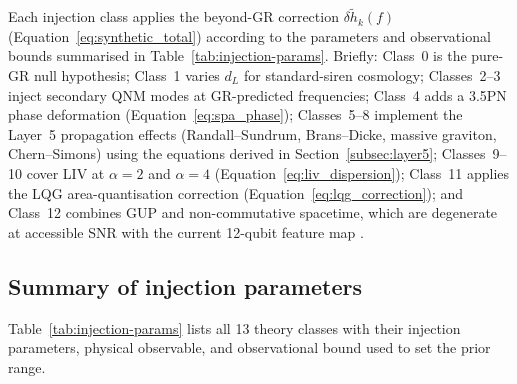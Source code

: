 \documentclass[11pt,a4paper, english]{book}
\theoremstyle{plain}
\theoremstyle{definition}
\numberwithin{equation}{chapter}
\numberwithin{figure}{chapter}
\numberwithin{table}{chapter}
\begin{document}
Each injection class applies the beyond-GR correction
$\delta\tilde{h}_k(f)$ (Equation~\ref{eq:synthetic_total})
according to the parameters and observational bounds
summarised in Table~\ref{tab:injection-params}. Briefly:
Class~0 is the pure-GR null hypothesis; Class~1 varies
$d_L$ for standard-siren cosmology; Classes~2--3 inject
secondary QNM modes at GR-predicted frequencies;
Class~4 adds a 3.5PN phase deformation
(Equation~\ref{eq:spa_phase}); Classes~5--8 implement the
Layer~5 propagation effects (Randall--Sundrum, Brans--Dicke,
massive graviton, Chern--Simons) using the equations derived
in Section~\ref{subsec:layer5}; Classes~9--10 cover
LIV at $\alpha=2$ and $\alpha=4$ (Equation~\ref{eq:liv_dispersion});
Class~11 applies the LQG area-quantisation correction
(Equation~\ref{eq:lqg_correction}); and Class~12 combines
GUP and non-commutative spacetime, which are degenerate
at accessible SNR with the current 12-qubit feature map
\cite{Kobakhidze_2016}.


\subsection{Summary of injection parameters}
\label{subsec:injection_summary}

Table~\ref{tab:injection-params} lists all 13 theory classes with their
injection parameters, physical observable, and observational bound used
to set the prior range.
\end{document}
